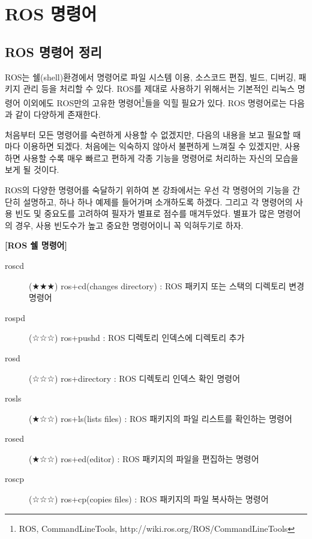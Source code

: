 

\chapter{ROS 명령어}

\section{ROS 명령어 정리}

ROS는 쉘(shell)환경에서 명령어로 파일 시스템 이용, 소스코드 편집, 빌드, 디버깅, 패키지 관리 등을 처리할 수 있다. ROS를 제대로 사용하기 위해서는 기본적인 리눅스 명령어 이외에도 ROS만의 고유한 명령어\footnote{ROS, CommandLineTools, http://wiki.ros.org/ROS/CommandLineTools}들을 익힐 필요가 있다. ROS 명령어로는 다음과 같이 다양하게 존재한다. 

처음부터 모든 명령어를 숙련하게 사용할 수 없겠지만, 다음의 내용을 보고 필요할 때마다 이용하면 되겠다. 처음에는 익숙하지 않아서 불편하게 느껴질 수 있겠지만, 사용하면 사용할 수록 매우 빠르고 편하게 각종 기능을 명령어로 처리하는 자신의 모습을 보게 될 것이다.

ROS의 다양한 명령어를 숙달하기 위하여 본 강좌에서는 우선 각 명령어의 기능을 간단히 설명하고, 하나 하나 예제를 들어가며 소개하도록 하겠다. 그리고 각 명령어의 사용 빈도 및 중요도를 고려하여 필자가 별표로 점수를 매겨두었다. 별표가 많은 명령어의 경우, 사용 빈도수가 높고 중요한 명령어이니 꼭 익혀두기로 하자.

\vspace{\baselineskip}
\noindent
\textbf{[ROS 쉘 명령어]}
\begin{description}
\item[roscd] (★★★) ros+cd(changes directory) : ROS 패키지 또는 스택의 디렉토리 변경 명령어
\item[rospd] (☆☆☆) ros+pushd : ROS 디렉토리 인덱스에 디렉토리 추가
\item[rosd] (☆☆☆) ros+directory : ROS 디렉토리 인덱스 확인 명령어
\item[rosls] (★☆☆) ros+ls(lists files) : ROS 패키지의 파일 리스트를 확인하는 명령어
\item[rosed] (★☆☆) ros+ed(editor) : ROS 패키지의 파일을 편집하는 명령어
\item[roscp] (☆☆☆) ros+cp(copies files) : ROS 패키지의 파일 복사하는 명령어
\end{description}

